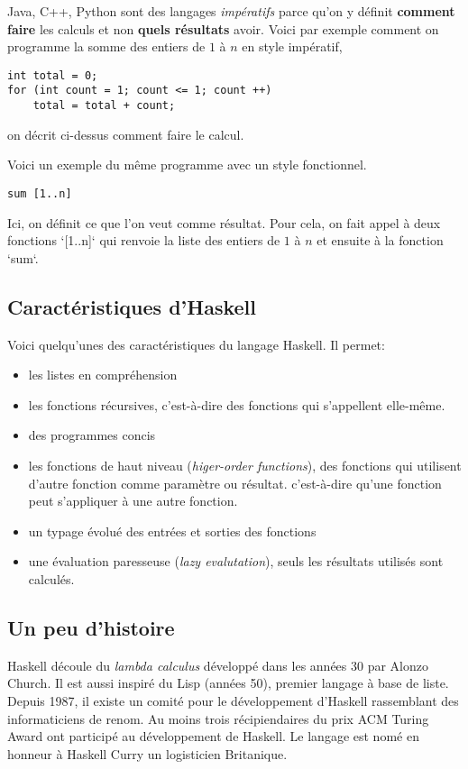 \documentclass[11pt]{article}
\begin{document}
Java, C++, Python  sont des langages  \emph{impératifs} parce qu'on y définit \textbf{comment faire} les calculs et non \textbf{quels résultats} avoir. Voici par exemple comment on programme la somme des entiers de \(1\) à \(n\) en style impératif,

\begin{verbatim}
int total = 0;
for (int count = 1; count <= 1; count ++)
    total = total + count;
\end{verbatim}
on décrit ci-dessus comment faire le calcul.

Voici un exemple du même programme avec un style fonctionnel.
\begin{verbatim}
sum [1..n]
\end{verbatim}
Ici, on définit ce que l'on veut comme résultat.  Pour cela, on fait appel à deux fonctions `[1..n]` qui renvoie la liste des entiers de \(1\) à \(n\) et ensuite à la fonction `sum`.

\subsection{Caractéristiques d'Haskell}
\label{sec:org8b963ae}
Voici quelqu'unes des caractéristiques du langage Haskell.  Il permet:
\begin{itemize}
\item les listes en compréhension
\item les fonctions récursives,  c'est-à-dire des fonctions qui s'appellent elle-même.
\item des programmes concis
\item les fonctions de haut niveau (\emph{higer-order functions}), des fonctions qui utilisent d'autre fonction comme paramètre ou résultat.
c'est-à-dire qu'une fonction peut s'appliquer à une autre fonction.
\item un typage évolué des entrées et sorties des fonctions
\item une évaluation paresseuse (\emph{lazy evalutation}), seuls les résultats utilisés sont calculés.
\end{itemize}

\subsection{Un peu d'histoire}
\label{sec:org768b146}
Haskell découle du \emph{lambda calculus}  développé dans les années 30 par Alonzo Church.   Il est aussi inspiré du Lisp (années 50), premier langage à base de liste.  Depuis 1987, il existe un comité pour le développement d'Haskell rassemblant des informaticiens de renom.  Au moins trois récipiendaires du prix ACM Turing Award ont participé au développement de Haskell.  Le langage est nomé en honneur à  Haskell Curry un logisticien Britanique.  
\end{document}
